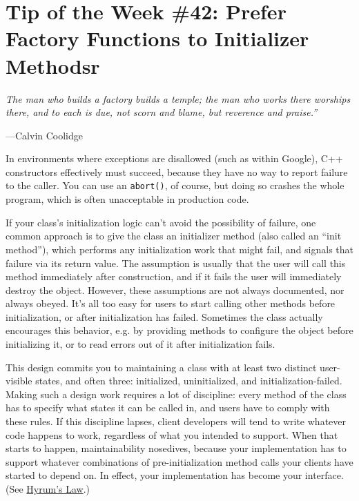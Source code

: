 
\chapter{Tip of the Week \#42: Prefer Factory Functions to Initializer Methodsr}\label{ch:tip-of-the-week-42}

\epigraph{\itshape The man who builds a factory builds a temple; the man who works there worships there, and to each is due, not scorn and blame, but reverence and praise.”}{---Calvin Coolidge}


In environments where exceptions are disallowed (such as within Google), C++ constructors effectively must succeed, because they have no way to report failure to the caller. You can use an \texttt{abort()}, of course, but doing so crashes the whole program, which is often unacceptable in production code.

If your class’s initialization logic can’t avoid the possibility of failure, one common approach is to give the class an initializer method (also called an \enquote{init method}), which performs any initialization work that might fail, and signals that failure via its return value. The assumption is usually that the user will call this method immediately after construction, and if it fails the user will immediately destroy the object. However, these assumptions are not always documented, nor always obeyed. It’s all too easy for users to start calling other methods before initialization, or after initialization has failed. Sometimes the class actually encourages this behavior, e.g. by providing methods to configure the object before initializing it, or to read errors out of it after initialization fails.

This design commits you to maintaining a class with at least two distinct user-visible states, and often three: initialized, uninitialized, and initialization-failed. Making such a design work requires a lot of discipline: every method of the class has to specify what states it can be called in, and users have to comply with these rules. If this discipline lapses, client developers will tend to write whatever code happens to work, regardless of what you intended to support. When that starts to happen, maintainability nosedives, because your implementation has to support whatever combinations of pre-initialization method calls your clients have started to depend on. In effect, your implementation has become your interface. (See \href{https://www.hyrumslaw.com/}{Hyrum’s Law}.)

